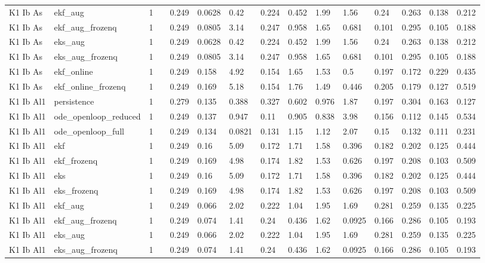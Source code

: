 \begin{table}[t]
\begin{tabular}{lllllllllllllll}
K1 Ib As & ekf\_aug & 1 &  & 0.249 & 0.0628 & 0.42 & 0.224 & 0.452 & 1.99 & 1.56 & 0.24 & 0.263 & 0.138 & 0.212 \\
K1 Ib As & ekf\_aug\_frozenq & 1 &  & 0.249 & 0.0805 & 3.14 & 0.247 & 0.958 & 1.65 & 0.681 & 0.101 & 0.295 & 0.105 & 0.188 \\
K1 Ib As & eks\_aug & 1 &  & 0.249 & 0.0628 & 0.42 & 0.224 & 0.452 & 1.99 & 1.56 & 0.24 & 0.263 & 0.138 & 0.212 \\
K1 Ib As & eks\_aug\_frozenq & 1 &  & 0.249 & 0.0805 & 3.14 & 0.247 & 0.958 & 1.65 & 0.681 & 0.101 & 0.295 & 0.105 & 0.188 \\
K1 Ib As & ekf\_online & 1 &  & 0.249 & 0.158 & 4.92 & 0.154 & 1.65 & 1.53 & 0.5 & 0.197 & 0.172 & 0.229 & 0.435 \\
K1 Ib As & ekf\_online\_frozenq & 1 &  & 0.249 & 0.169 & 5.18 & 0.154 & 1.76 & 1.49 & 0.446 & 0.205 & 0.179 & 0.127 & 0.519 \\
K1 Ib Al1 & persistence & 1 &  & 0.279 & 0.135 & 0.388 & 0.327 & 0.602 & 0.976 & 1.87 & 0.197 & 0.304 & 0.163 & 0.127 \\
K1 Ib Al1 & ode\_openloop\_reduced & 1 &  & 0.249 & 0.137 & 0.947 & 0.11 & 0.905 & 0.838 & 3.98 & 0.156 & 0.112 & 0.145 & 0.534 \\
K1 Ib Al1 & ode\_openloop\_full & 1 &  & 0.249 & 0.134 & 0.0821 & 0.131 & 1.15 & 1.12 & 2.07 & 0.15 & 0.132 & 0.111 & 0.231 \\
K1 Ib Al1 & ekf & 1 &  & 0.249 & 0.16 & 5.09 & 0.172 & 1.71 & 1.58 & 0.396 & 0.182 & 0.202 & 0.125 & 0.444 \\
K1 Ib Al1 & ekf\_frozenq & 1 &  & 0.249 & 0.169 & 4.98 & 0.174 & 1.82 & 1.53 & 0.626 & 0.197 & 0.208 & 0.103 & 0.509 \\
K1 Ib Al1 & eks & 1 &  & 0.249 & 0.16 & 5.09 & 0.172 & 1.71 & 1.58 & 0.396 & 0.182 & 0.202 & 0.125 & 0.444 \\
K1 Ib Al1 & eks\_frozenq & 1 &  & 0.249 & 0.169 & 4.98 & 0.174 & 1.82 & 1.53 & 0.626 & 0.197 & 0.208 & 0.103 & 0.509 \\
K1 Ib Al1 & ekf\_aug & 1 &  & 0.249 & 0.066 & 2.02 & 0.222 & 1.04 & 1.95 & 1.69 & 0.281 & 0.259 & 0.135 & 0.225 \\
K1 Ib Al1 & ekf\_aug\_frozenq & 1 &  & 0.249 & 0.074 & 1.41 & 0.24 & 0.436 & 1.62 & 0.0925 & 0.166 & 0.286 & 0.105 & 0.193 \\
K1 Ib Al1 & eks\_aug & 1 &  & 0.249 & 0.066 & 2.02 & 0.222 & 1.04 & 1.95 & 1.69 & 0.281 & 0.259 & 0.135 & 0.225 \\
K1 Ib Al1 & eks\_aug\_frozenq & 1 &  & 0.249 & 0.074 & 1.41 & 0.24 & 0.436 & 1.62 & 0.0925 & 0.166 & 0.286 & 0.105 & 0.193 \\

\end{tabular}
\end{table}
